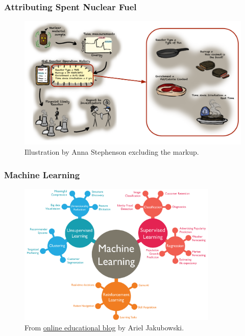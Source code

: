 \begin{frame}
  \frametitle{Attributing Spent Nuclear Fuel}
  \vspace{-5mm}
  \begin{figure}
    \centering
    \includegraphics[width=\textwidth]{./figures/nf_and_params.png}
    \\ \scriptsize Illustration by Anna Stephenson excluding the markup.
  \end{figure}
\end{frame}

\begin{frame}
  \frametitle{Machine Learning}
  \begin{figure}
    \centering
    \includegraphics[width=0.85\textwidth]{./figures/ml_intro.png}
    \\ \scriptsize From
    \href{https://betterprogramming.pub/an-introduction-to-machine-learning-a4a6506c4bc7}{\color{blue}online
    educational blog} by Ariel Jakubowski.
  \end{figure}
\end{frame}


